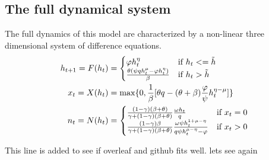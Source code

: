 \subsection{The full dynamical system} 
The full dynamics of this model are characterized by a non-linear three dimensional system of difference equations.
        \begin{equation}
    \begin{aligned}
    h_{t+1} = F(h_t)  &= \begin{cases}
                    \varphi h_{t}^{\eta}  & \text{if } h_t <= \Tilde{h} \\
                     \frac{\theta (\psi q h_{t}^{\mu} - \varphi h_{t}^{\eta})}{\beta}  & \text{if } h_t > \Tilde{h}
                     \end{cases}\\
    x_t = X(h_t)  &= \max \{0, \frac{1}{\beta}[\theta q - (\theta + \beta) \frac{\varphi}{\psi}  h_t^{\eta - \mu}]\} \\
    n_t = N(h_t)  &= \begin{cases}
                \frac{(1-\gamma)(\beta + \theta)}{\gamma + (1-\gamma)(\beta + \theta)} \frac{\omega h_t}{q} & \text{if } x_t = 0 \\
                \frac{(1-\gamma)\beta}{\gamma + (1-\gamma)(\beta + \theta)} \frac{\omega \psi h_t^{1 + \mu - \eta }}{q \psi h_t^{\mu - \eta} - \varphi}   & \text{if } x_t > 0
                 \end{cases}
    \end{aligned}
    \end{equation}

This line is added to see if overleaf and github fits well. lets see again

